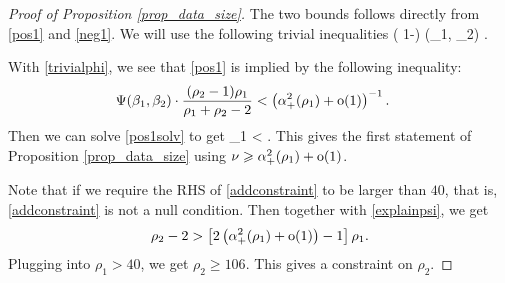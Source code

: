 \begin{proof}[Proof of Proposition \ref{prop_data_size}]
The two bounds follows directly from \eqref{pos1} and \eqref{neg1}. We will use the following trivial inequalities 
\be\label{trivialphi}
\cdot \left( 1-\right) \le  \Phi(\rho_1, \rho_2) \le  {}.
\ee

%

 With \eqref{trivialphi}, we see that \eqref{pos1} is implied by the following inequality:
\begin{align}\label{pos1solv}
 &  \Psi(\beta_1,\beta_2) \cdot \frac{(\rho_2-1) \rho_1 }{\rho_1+\rho_2-2}   < \left( \alpha_+^2(\rho_1) +  \operatorname{o}(1) \right)^{-1} .
 \end{align}
 Then we can solve \eqref{pos1solv} to get
 \be\label{addconstraint}\rho_1 <   .\ee
 This gives the first statement of Proposition \ref{prop_data_size} using $\nu\geqslant \alpha_+^2(\rho_1) +  \operatorname{o}(1) $. %
 
 
 Note that if we require the RHS of \eqref{addconstraint} to be larger than $40$, that is, \eqref{addconstraint} is not a null condition. Then together with \eqref{explainpsi}, we get
 $$ \rho_2 - 2>\left[ 2\left( \alpha_+^2(\rho_1) +  \operatorname{o}(1) \right)  -1\right]\rho_1 .$$
Plugging into $\rho_1>40$, we get $\rho_2 \ge 106$. This gives a constraint on $\rho_2$. 
 


\end{proof}
